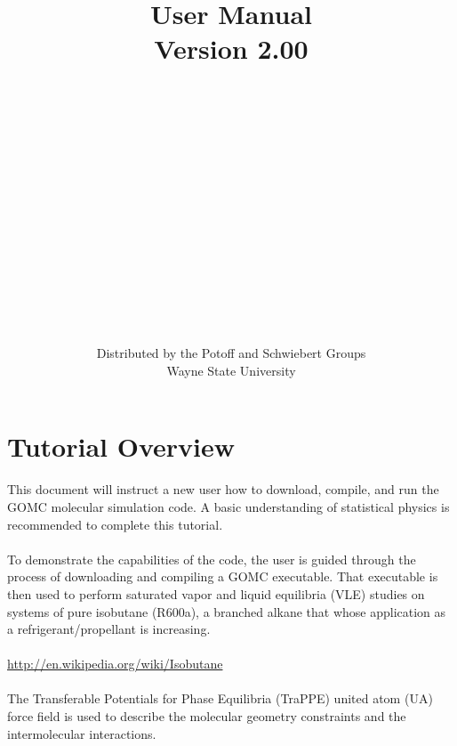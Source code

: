 \title{\Huge User Manual\\Version 2.00}
\author{\\\\\\\\\\\\\\\\\\\\\\\\\\\\\\Distributed by the Potoff and Schwiebert Groups\\\textcopyright Wayne State University}

\maketitle
\thispagestyle{empty}
\newpage

\tableofcontents
\newpage

\section{Tutorial Overview}
This document will instruct a new user how to download, compile, and run the GOMC molecular simulation code.  A basic understanding of statistical physics is recommended to complete this tutorial.\\\\
To demonstrate the capabilities of the code, the user is guided through the process of downloading and compiling a GOMC executable.  That executable is then used to perform saturated vapor and liquid equilibria (VLE) studies on systems of pure isobutane (R600a), a branched alkane that whose application as a refrigerant/propellant is increasing.\\\\
\url{http://en.wikipedia.org/wiki/Isobutane}\\\\
The Transferable Potentials for Phase Equilibria (TraPPE) united atom (UA) force field is used to describe the molecular geometry constraints and the intermolecular interactions.

